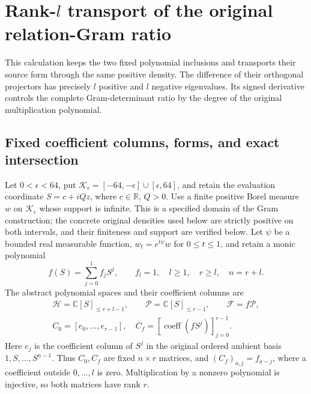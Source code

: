 \section{Rank-\texorpdfstring{$l$}{l} transport of the original relation-Gram ratio}

This calculation keeps the two fixed polynomial inclusions and transports
their source form through the same positive density. The difference of
their orthogonal projectors has precisely $l$ positive and $l$ negative
eigenvalues. Its signed derivative controls the complete Gram-determinant
ratio by the degree of the original multiplication polynomial.

\subsection{Fixed coefficient columns, forms, and exact intersection}
Let $0<\epsilon<64$, put
$\mathcal K_\epsilon=[-64,-\epsilon]\cup[\epsilon,64]$, and retain the
evaluation coordinate $S=c+iQz$, where $c\in\mathbb R$, $Q>0$.
Use a finite positive Borel measure $w$ on $\mathcal K_\epsilon$ whose
support is infinite. This is a specified domain of the Gram construction;
the concrete original densities used below are strictly positive on both
intervals, and their finiteness and support are verified below.
Let $\psi$ be a bounded real measurable function, $w_t=e^{t\psi}w$ for
$0\leq t\leq1$, and retain a monic polynomial
\[
 f(S)=\sum_{j=0}^l f_jS^j,\qquad f_l=1,\quad
 l\geq1,\quad r\geq l,\quad n=r+l.
 \tag{CTR1}
\]
The abstract polynomial spaces and their coefficient columns are
\[
\begin{gathered}
 \mathcal H=\mathbb C[S]_{\leq r+l-1},\qquad
 \mathcal P=\mathbb C[S]_{\leq r-1},\qquad
 \mathcal F=f\mathcal P,\\
 C_0=[e_0,\ldots,e_{r-1}],\quad
 C_f=[\operatorname{coeff}(fS^j)]_{j=0}^{r-1}.
\end{gathered}
 \tag{CTR2}
\]
Here $e_j$ is the coefficient column of $S^j$ in the original ordered
ambient basis $1,S,\ldots,S^{n-1}$. Thus $C_0,C_f$ are fixed $n\times r$
matrices, and $(C_f)_{a,j}=f_{a-j}$, where a coefficient outside $0,\ldots,l$
is zero. Multiplication by a nonzero polynomial is injective, so both
matrices have rank $r$.


